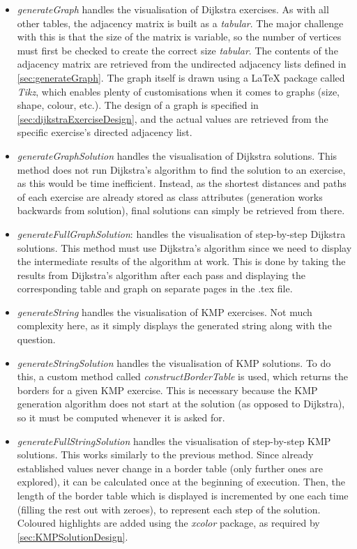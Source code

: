\documentclass{l4proj}
\begin{document}
\begin{itemize}
	\item
	\emph{generateGraph} handles the visualisation of Dijkstra exercises. As with all other tables, the adjacency matrix is built as a \emph{tabular}. The major challenge with this is that the size of the matrix is variable, so the number of vertices must first be checked to create the correct size \emph{tabular}. The contents of the adjacency matrix are retrieved from the undirected adjacency lists defined in \autoref{sec:generateGraph}. The graph itself is drawn using a LaTeX package called \emph{Tikz}, which enables plenty of customisations when it comes to graphs (size, shape, colour, etc.). The design of a graph is specified in \autoref{sec:dijkstraExerciseDesign}, and the actual values are retrieved from the specific exercise's directed adjacency list.
	\item
	\emph{generateGraphSolution} handles the visualisation of Dijkstra solutions. This method does not run Dijkstra's algorithm to find the solution to an exercise, as this would be time inefficient. Instead, as the shortest distances and paths of each exercise are already stored as class attributes (generation works backwards from solution), final solutions can simply be retrieved from there.
	\item
	\emph{generateFullGraphSolution}: handles the visualisation of step-by-step Dijkstra solutions. This method must use Dijkstra's algorithm since we need to display the intermediate results of the algorithm at work. This is done by taking the results from Dijkstra's algorithm after each pass and displaying the corresponding table and graph on separate pages in the .tex file.  
	\item
	\emph{generateString} handles the visualisation of KMP exercises. Not much complexity here, as it simply displays the generated string along with the question.
	\item
	\emph{generateStringSolution} handles the visualisation of KMP solutions. To do this, a custom method called \emph{constructBorderTable} is used, which returns the borders for a given KMP exercise. This is necessary because the KMP generation algorithm does not start at the solution (as opposed to Dijkstra), so it must be computed whenever it is asked for.
	\item
	\emph{generateFullStringSolution} handles the visualisation of step-by-step KMP solutions. This works similarly to the previous method. Since already established values never change in a border table (only further ones are explored), it can be calculated once at the beginning of execution. Then, the length of the border table which is displayed is incremented by one each time (filling the rest out with zeroes), to represent each step of the solution. Coloured highlights are added using the \emph{xcolor} package, as required by \autoref{sec:KMPSolutionDesign}.
\end{itemize}
\end{document}
